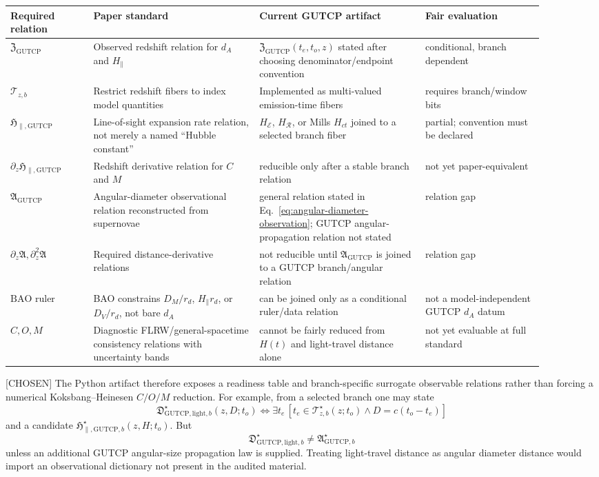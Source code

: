 \documentclass[11pt]{article}
\newcommand{\RG}{\mathcal{R}}
\newcommand{\EG}{\mathcal{E}}
\newcommand{\ZRel}{\mathfrak{Z}_{\mathrm{GUTCP}}}
\newcommand{\HRel}{\mathfrak{H}_{\parallel,\mathrm{GUTCP}}}
\newcommand{\ARel}{\mathfrak{A}_{\mathrm{GUTCP}}}
\begin{document}
\begingroup
\scriptsize
\setlength{\tabcolsep}{2pt}
\begin{longtable}{p{0.14\linewidth}p{0.28\linewidth}p{0.28\linewidth}p{0.20\linewidth}}
\toprule
Required relation & Paper standard & Current GUTCP artifact & Fair evaluation\\
\midrule
\endhead
\(\ZRel\) & Observed redshift relation for \(d_A\) and \(H_{\parallel}\) &
\(\ZRel(t_e,t_o,z)\) stated after choosing denominator/endpoint convention &
conditional, branch dependent\\
\addlinespace
\(\mathcal{T}_{z,b}\) & Restrict redshift fibers to index model quantities &
Implemented as multi-valued emission-time fibers & requires branch/window bits\\
\addlinespace
\(\HRel\) & Line-of-sight expansion rate relation, not merely a named
``Hubble constant'' & \(H_{\EG}\), \(H_{\RG}\), or Mills \(H_{ct}\) joined to a
selected branch fiber & partial; convention must be declared\\
\addlinespace
\(\partial_z\HRel\) & Redshift derivative relation for \(C\) and \(M\) &
reducible only after a stable branch relation & not yet paper-equivalent\\
\addlinespace
\(\ARel\) & Angular-diameter observational relation reconstructed from
supernovae & general relation stated in Eq.~\eqref{eq:angular-diameter-observation};
GUTCP angular-propagation relation not stated & relation gap\\
\addlinespace
\(\partial_z\mathfrak{A},\partial_z^2\mathfrak{A}\) & Required distance-derivative relations
& not reducible until \(\ARel\) is joined to a GUTCP branch/angular relation &
relation gap\\
\addlinespace
\(\mathrm{BAO}\) ruler & BAO constrains \(D_M/r_d\),
\(H_{\parallel}r_d\), or \(D_V/r_d\), not bare \(d_A\) & can be joined only as
a conditional ruler/data relation & not a model-independent GUTCP \(d_A\)
datum\\
\addlinespace
\(C,O,M\) & Diagnostic FLRW/general-spacetime consistency relations with
uncertainty bands & cannot be fairly reduced from \(H(t)\) and light-travel
distance alone & not yet evaluable at full standard\\
\bottomrule
\end{longtable}
\endgroup

[CHOSEN] The Python artifact therefore exposes a readiness table and
branch-specific surrogate observable relations rather than forcing a numerical
Koksbang--Heinesen \(C/O/M\) reduction.  For example, from a selected branch
one may state
\[
\mathfrak{D}_{\mathrm{GUTCP},\mathrm{light},b}^{\star}(z,D;t_o)
\Longleftrightarrow
\exists t_e\,
\left[
t_e\in\mathcal{T}_{z,b}^{\star}(z;t_o)
\wedge D=c(t_o-t_e)
\right]
\]
and a candidate
\(\mathfrak{H}_{\parallel,\mathrm{GUTCP},b}^{\star}(z,H;t_o)\).  But
\[
\mathfrak{D}_{\mathrm{GUTCP},\mathrm{light},b}^{\star}
\ne
\mathfrak{A}_{\mathrm{GUTCP},b}^{\star}
\]
unless an additional GUTCP angular-size propagation law is supplied.  Treating
light-travel distance as angular diameter distance would import an
observational dictionary not present in the audited material.
\end{document}
